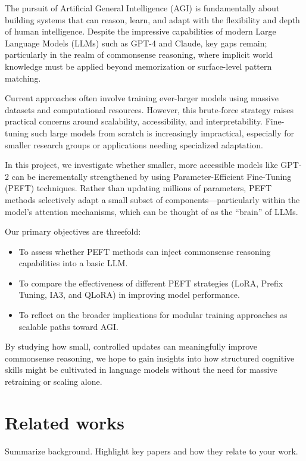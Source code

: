 \documentclass[11pt,twocolumn]{article}
\begin{document}
The pursuit of Artificial General Intelligence (AGI) is fundamentally about building systems that can reason, learn, and adapt with the flexibility and depth of human intelligence. Despite the impressive capabilities of modern Large Language Models (LLMs) such as GPT-4 and Claude, key gaps remain; particularly in the realm of commonsense reasoning, where implicit world knowledge must be applied beyond memorization or surface-level pattern matching.

Current approaches often involve training ever-larger models using massive datasets and computational resources. However, this brute-force strategy raises practical concerns around scalability, accessibility, and interpretability. Fine-tuning such large models from scratch is increasingly impractical, especially for smaller research groups or applications needing specialized adaptation.

In this project, we investigate whether smaller, more accessible models like GPT-2 can be incrementally strengthened by using Parameter-Efficient Fine-Tuning (PEFT) techniques. Rather than updating millions of parameters, PEFT methods selectively adapt a small subset of components—particularly within the model's attention mechanisms, which can be thought of as the “brain” of LLMs.

Our primary objectives are threefold:
\begin{itemize}
    \item To assess whether PEFT methods can inject commonsense reasoning capabilities into a basic LLM.
    \item To compare the effectiveness of different PEFT strategies (LoRA, Prefix Tuning, IA3, and QLoRA) in improving model performance.
    \item To reflect on the broader implications for modular training approaches as scalable paths toward AGI.
\end{itemize}

By studying how small, controlled updates can meaningfully improve commonsense reasoning, we hope to gain insights into how structured cognitive skills might be cultivated in language models without the need for massive retraining or scaling alone.



\section{Related works}
\label{sec:background}
Summarize background. Highlight key papers and how they relate to your work.
\end{document}
